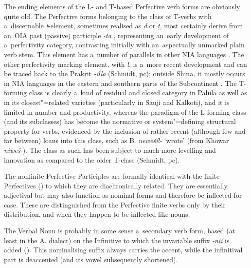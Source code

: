 The ending elements of the L- and T-based Perfective verb forms are obviously quite old. The Perfective forms belonging to the class of T-verbs with a~discernable \textit{t}-element, sometimes realised as \textit{d} or \textit{ṭ}, most certainly derive from an~OIA past (passive) participle \textit{-ta} \citep[952]{whitney1960}, representing an~early development of a~perfectivity category, contrasting initially with an~aspectually unmarked plain verb stem. This element has a~number of parallels in other NIA languages \citep[269, 272]{masica1991}. The other perfectivity marking element, with \textit{l}, is a~more recent development and can be traced back to the Prakrit \textit{-illa} (Schmidt, pc); outside Shina, it mostly occurs in NIA languages in the eastern and southern parts of the Subcontinent \citep[270]{masica1991}. The T-forming class is clearly a~kind of residual and closed category in Palula as well as in its closest"=related varieties (particularly in Sauji and Kalkoti), and it is limited in number and productivity, whereas the paradigm of the L-forming class (and its subclasses) has become the normative or system"=defining structural property \citep[104]{mcmahon1994} for verbs, evidenced by the inclusion of rather recent (although few and far between) loans into this class, such as B. \textit{newešíl-} `wrote' (from Khowar \textit{niweš-}). The class as such has been subject to much more levelling and innovation as compared to the older T-class (Schmidt, pc).


 The nonfinite Perfective Participles are formally identical with
the finite Perfectives () to which they are diachronically related. They are
essentially adjectival but may also function as nominal forms and therefore be inflected for
case. These are distinguished from the Perfective finite verbs only by their distribution, and when
they happen to be inflected like nouns.

 The Verbal Noun is probably in some sense a~secondary verb form, based (at
least in the A. dialect) on the Infinitive to which the invariable suffix \textit{-nií} is added
(). This nominalising suffix always carries the accent, while the infinitival part
is deaccented (and its vowel subsequently shortened).

